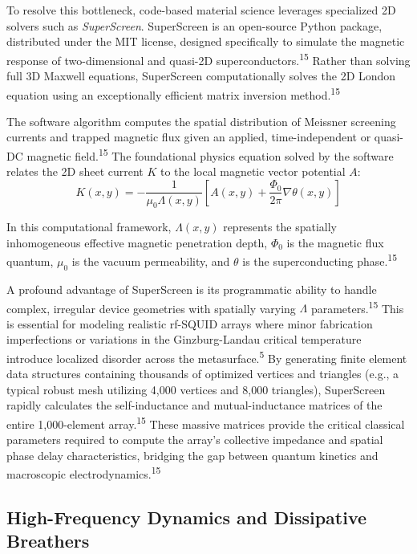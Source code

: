 \documentclass[11pt, a4paper]{article}
\begin{document}
To resolve this bottleneck, code-based material science leverages specialized 2D solvers such as \textit{SuperScreen}. SuperScreen is an open-source Python package, distributed under the MIT license, designed specifically to simulate the magnetic response of two-dimensional and quasi-2D superconductors.\textsuperscript{15} Rather than solving full 3D Maxwell equations, SuperScreen computationally solves the 2D London equation using an exceptionally efficient matrix inversion method.\textsuperscript{15}

The software algorithm computes the spatial distribution of Meissner screening currents and trapped magnetic flux given an applied, time-independent or quasi-DC magnetic field.\textsuperscript{15} The foundational physics equation solved by the software relates the 2D sheet current $K$ to the local magnetic vector potential $A$:
\begin{equation}
K(x,y) = -\frac{1}{\mu_0 \Lambda(x,y)} \left[ A(x,y) + \frac{\Phi_0}{2\pi} \nabla\theta(x,y) \right]
\end{equation}

In this computational framework, $\Lambda(x,y)$ represents the spatially inhomogeneous effective magnetic penetration depth, $\Phi_0$ is the magnetic flux quantum, $\mu_0$ is the vacuum permeability, and $\theta$ is the superconducting phase.\textsuperscript{15}

A profound advantage of SuperScreen is its programmatic ability to handle complex, irregular device geometries with spatially varying $\Lambda$ parameters.\textsuperscript{15} This is essential for modeling realistic rf-SQUID arrays where minor fabrication imperfections or variations in the Ginzburg-Landau critical temperature introduce localized disorder across the metasurface.\textsuperscript{5} By generating finite element data structures containing thousands of optimized vertices and triangles (e.g., a typical robust mesh utilizing 4,000 vertices and 8,000 triangles), SuperScreen rapidly calculates the self-inductance and mutual-inductance matrices of the entire 1,000-element array.\textsuperscript{15} These massive matrices provide the critical classical parameters required to compute the array's collective impedance and spatial phase delay characteristics, bridging the gap between quantum kinetics and macroscopic electrodynamics.\textsuperscript{15}

\subsection{High-Frequency Dynamics and Dissipative Breathers}
\end{document}
